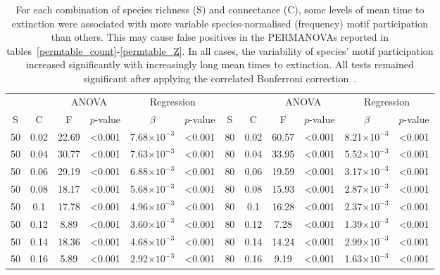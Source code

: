 \documentclass[12pt]{article}
\begin{document}
\begin{spacing}{2.0}
		\begin{table}[h!]
			\caption{For each combination of species richness (S) and connectance (C), some levels of mean time to extinction were associated with more variable species-normalised (frequency) motif participation than others. This may cause false positives in the PERMANOVAs reported in tables~\ref{permtable_count}-\ref{permtable_Z}. In all cases, the variability of species' motif participation increased significantly with increasingly long mean times to extinction. All tests remained significant after applying the correlated Bonferroni correction~\citep{Drezner2016}.}
			\label{betadisp_freq}
			\footnotesize
			\begin{tabular}{c c | c c| c c ||c c | c c | c c |}
        &&\multicolumn{2}{c|}{ANOVA}&\multicolumn{2}{c||}{Regression}&&&\multicolumn{2}{c|}{ANOVA}&\multicolumn{2}{c|}{Regression}\\
        S&C&F&$p$-value&$\beta$&$p$-value&S&C&F&$p$-value&$\beta$&$p$-value\\
        \hline
        50  & 0.02  & 22.69 & \textless0.001  & 7.68$\times10^{-3}$ & \textless0.001  & 80  & 0.02  & 60.57 & \textless0.001  & 8.21$\times10^{-3}$ & \textless0.001  \\
        50  & 0.04  & 30.77 & \textless0.001  & 7.63$\times10^{-3}$ & \textless0.001  & 80  & 0.04  & 33.95 & \textless0.001  & 5.52$\times10^{-3}$ & \textless0.001  \\
        50  & 0.06  & 29.19 & \textless0.001  & 6.88$\times10^{-3}$ & \textless0.001  & 80  & 0.06  & 19.59 & \textless0.001  & 3.17$\times10^{-3}$ & \textless0.001  \\
        50  & 0.08  & 18.17 & \textless0.001  & 5.68$\times10^{-3}$ & \textless0.001  & 80  & 0.08  & 15.93 & \textless0.001  & 2.87$\times10^{-3}$ & \textless0.001  \\
        50  & 0.1 & 17.78 & \textless0.001  & 4.96$\times10^{-3}$ & \textless0.001  & 80  & 0.1 & 16.28 & \textless0.001  & 2.37$\times10^{-3}$ & \textless0.001  \\
        50  & 0.12  & 8.89  & \textless0.001  & 3.60$\times10^{-3}$ & \textless0.001  & 80  & 0.12  & 7.28  & \textless0.001  & 1.39$\times10^{-3}$ & \textless0.001  \\
        50  & 0.14  & 18.36 & \textless0.001  & 4.68$\times10^{-3}$ & \textless0.001  & 80  & 0.14  & 14.24 & \textless0.001  & 2.99$\times10^{-3}$ & \textless0.001  \\
        50  & 0.16  & 5.89  & \textless0.001  & 2.92$\times10^{-3}$ & \textless0.001  & 80  & 0.16  & 9.19  & \textless0.001  & 1.63$\times10^{-3}$ & \textless0.001  \\

\end{tabular}
\end{table}
\end{spacing}
\end{document}
